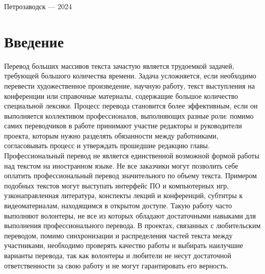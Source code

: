 \documentclass[a4paper,12pt]{article}
\begin{document}
\vfill

\begin{center}
\large
    Петрозаводск --- 2024
\end{center}




\newpage

\tableofcontents




\newpage
\section*{Введение}

Перевод больших массивов текста зачастую является трудоемкой задачей, требующей большого количества времени. Задача усложняется, если необходимо перевести художественное произведение, научную работу, текст выступления на конференции или справочные материалы, содержащие большое количество специальной лексики. Процесс перевода становится более эффективным, если он выполняется коллективом профессионалов, выполняющих разные роли: помимо самих переводчиков в работе принимают участие редакторы и руководители проекта, которым нужно разделять обязанности между работниками, согласовывать процесс и утверждать прошедшие редакцию главы. \\

Профессиональный перевод не является единственной возможной формой работы над текстом на иностранном языке. Не все заказчики могут позволить себе оплатить профессиональный перевод значительного по объему текста. Примером подобных текстов могут выступать интерфейс ПО и компьютерных игр, узконаправленная литература, конспекты лекций и конференций, субтитры к видеоматериалам, находящимся в открытом доступе. Такую работу часто выполняют волонтеры, не все из которых обладают достаточными навыками для выполнения профессионального перевода. В проектах, связанных с любительским переводом, помимо синхронизации и распределения частей текста между участниками, необходимо проверять качество работы и выбирать наилучшие варианты перевода, так как волонтеры и любители не несут достаточной ответственности за свою работу и не могут гарантировать его верность. \\
\end{document}
